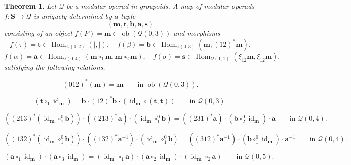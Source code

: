 \documentclass{amsart}
\newcommand{\calQ}{\mathcal{Q}}
\newcommand{\bS}{\mathbf{S}}
\newcommand{\id}{\operatorname{id}}
\newcommand{\Hom}{\operatorname{Hom}}
\newcommand{\ob}{\operatorname{ob}}
\newtheorem{thm}[theorem]{Theorem}%
\theoremstyle{definition}
\numberwithin{equation}{section}
\begin{document}
\begin{thm}\label{thm: presentation for maps out of bS}
Let \(\calQ\) be a modular operad in groupoids. A map of modular operads \(f:\bS\longrightarrow \calQ\) is uniquely determined by a tuple
\[
(\mathbf{m},\mathbf{t},\mathbf{b},\mathbf{a},\mathbf{s})
\]
consisting of an object $f(P)=\mathbf{m}\in \ob(\calQ(0,3))$ 
and morphisms
\[
f(\tau)=\mathbf{t}\in \Hom_{\calQ(0,2)}(|,|),\quad
f(\beta)=\mathbf{b}\in
\Hom_{\calQ(0,3)}(\mathbf{m},(12)^*\mathbf{m}),
\]
\[
f(\alpha)=\mathbf{a}\in
\Hom_{\calQ(0,4)}
(\mathbf{m}\circ_1\mathbf{m},\mathbf{m}\circ_2\mathbf{m}),
\quad
f(\sigma)=\mathbf{s}\in
\Hom_{\calQ(1,1)}(\xi_{12}\mathbf{m},\xi_{12}\mathbf{m}),
\]
satisfying the following relations. %

\begin{equation}\label{sym_rel_morph}\tag{S}
(012)^*(\mathbf{m})=\mathbf{m}
\qquad \text{in } \ob(\calQ(0,3)).
\end{equation}

\begin{equation}\label{twist_rel_morphS}\tag{T}
(\mathbf{t}\circ_1 \id_{\mathbf{m}})
=
\mathbf{b}\cdot (12)^*\mathbf{b}\cdot
(\id_{\mathbf{m}}\circ(\mathbf{t},\mathbf{t}))
\qquad \text{in } \calQ(0,3).
\end{equation}

\begin{equation}\label{hex_rel_1_morphS}\tag{H1}
((213)^*(\id_{\mathbf{m}}\circ_{1}^{0}\mathbf{b}))
\cdot ((213)^*\mathbf{a})
\cdot (\id_{\mathbf{m}}\circ_{1}^{0}\mathbf{b})
=
((231)^*\mathbf{a})
\cdot (\mathbf{b}\circ_{2}^{0}\id_{\mathbf{m}})
\cdot \mathbf{a}
\qquad \text{in } \calQ(0,4).
\end{equation}

\begin{equation}\label{hex_rel_2_morphS}\tag{H2}
((132)^*(\id_{\mathbf{m}}\circ_{1}^{0}\mathbf{b}))
\cdot ((132)^*\mathbf{a}^{-1})
\cdot (\id_{\mathbf{m}}\circ_{1}^{0}\mathbf{b})
=
((312)^*\mathbf{a}^{-1})
\cdot (\mathbf{b}\circ_{1}^{0}\id_{\mathbf{m}})
\cdot \mathbf{a}^{-1}
\qquad \text{in } \calQ(0,4).
\end{equation}

\begin{equation}\label{pent_rel_1_morphS}\tag{P}
(\mathbf{a}\circ_1 \id_{\mathbf{m}})
\cdot(\mathbf{a}\circ_3 \id_{\mathbf{m}})
=
(\id_{\mathbf{m}}\circ_1\mathbf{a})
\cdot (\mathbf{a}\circ_2 \id_{\mathbf{m}})
\cdot (\id_{\mathbf{m}}\circ_2\mathbf{a})
\qquad \text{in } \calQ(0,5).
\end{equation}


\end{thm}
\end{document}
